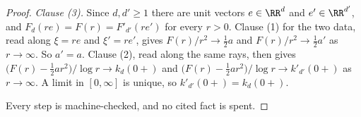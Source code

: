 \begin{proof}
\emph{Clause (3).} Since $d, d' \ge 1$ there are unit vectors $e \in \RR^d$ and $e' \in \RR^{d'}$,
and $F_d(re) = F(r) = F'_{d'}(re')$ for every $r > 0$. Clause (1) for the two data, read along
$\xi = re$ and $\xi' = re'$, gives $F(r)/r^2 \to \tfrac12 a$ and $F(r)/r^2 \to \tfrac12 a'$ as
$r \to \infty$. So $a' = a$. Clause (2), read along the same rays, then gives
$\bigl(F(r) - \tfrac12 a r^2\bigr)/\log r \to k_d(0{+})$ and
$\bigl(F(r) - \tfrac12 a r^2\bigr)/\log r \to k'_{d'}(0{+})$ as $r \to \infty$. A limit in
$[0,\infty]$ is unique, so $k'_{d'}(0{+}) = k_d(0{+})$.

Every step is machine-checked, and no cited fact is spent.
\end{proof}

